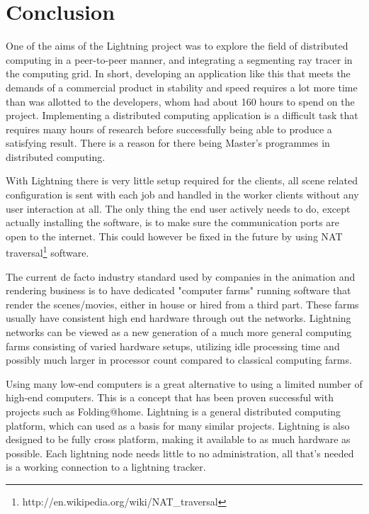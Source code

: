 \section{Conclusion}
One of the aims of the Lightning project was to explore the field of distributed
computing in a peer-to-peer manner, and integrating a segmenting ray tracer in
the computing grid. In short, developing an application like this that meets 
the demands of a commercial product in stability and speed requires a lot more 
time than was allotted to the developers, whom had about 160 hours to spend on
the project. Implementing a distributed computing application is a difficult
task that requires many hours of research before successfully being able to
produce a satisfying result. There is a reason for there being Master's
programmes in distributed computing.


With Lightning there is very little setup required for the clients,
all scene related configuration is sent with each job and handled in the
worker clients without any user interaction at all. The only thing the end
user actively needs to do, except actually installing the software, is to
make sure the communication ports are open to the internet. This could however
be fixed in the future by using NAT traversal\footnote{http://en.wikipedia.org/wiki/NAT\_traversal} software.

The current de facto industry standard used by companies in the animation and
rendering business is to have dedicated "computer farms" running software
that render the scenes/movies, either in house or hired from a third part.
These farms usually have  consistent high end hardware through out the
networks. Lightning networks can be viewed as a new generation of a much
more general computing farms consisting of varied hardware setups, utilizing
idle processing time and possibly much larger in processor count compared to
classical computing farms.


Using many low-end computers is a great alternative to using a limited number
of high-end computers. This is a concept that has been proven successful
with projects such as Folding@home. Lightning is a general distributed
computing platform, which can used as a basis for many similar projects.
Lightning is also designed to be fully cross platform, making it available to
as much hardware as possible. Each lightning node needs little to no
administration, all that's needed is a working connection to a lightning
tracker.

